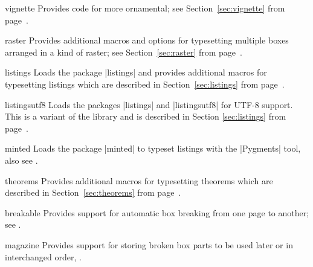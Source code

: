 {\begin{docTcbKey}[library]{vignette}{}{}
  Provides code for more ornamental; see
  Section~\ref{sec:vignette} from page~\pageref{sec:vignette}.
\end{docTcbKey}

\begin{docTcbKey}[library]{raster}{}{}
  Provides additional macros and options for typesetting multiple
  boxes arranged in a kind of raster;
  see Section~\ref{sec:raster} from page~\pageref{sec:raster}.
\end{docTcbKey}

\begin{docTcbKey}[library]{listings}{}{}
  Loads the package |listings| \cite{hoffmann:2018a} and provides additional
  macros for typesetting listings which are described in Section~\ref{sec:listings}
  from page~\pageref{sec:listings}.
\end{docTcbKey}

\begin{docTcbKey}[library]{listingsutf8}{}{}
  Loads the packages |listings| \cite{hoffmann:2018a} and
  |listingsutf8| \cite{oberdiek:2016b} for UTF-8 support.
  This is a variant of the library 
  and is described in Section \ref{sec:listings}
  from page~\pageref{sec:listings}.
\end{docTcbKey}

\begin{docTcbKey}[library]{minted}{}{}
  Loads the package |minted| \cite{poore:minted} to
  typeset listings with the |Pygments| \cite{pygments:web} tool,
  also see .
\end{docTcbKey}

\begin{docTcbKey}[library]{theorems}{}{}
  Provides additional
  macros for typesetting theorems which are described in Section~\ref{sec:theorems}
  from page~\pageref{sec:theorems}.
\end{docTcbKey}


\begin{docTcbKey}[library]{breakable}{}{}
  Provides support for automatic box breaking from one page to another;
  see .
\end{docTcbKey}

\begin{docTcbKey}[library]{magazine}{}{}
  Provides support for storing broken box parts to be used later or
  in interchanged order, .
\end{docTcbKey}

}
